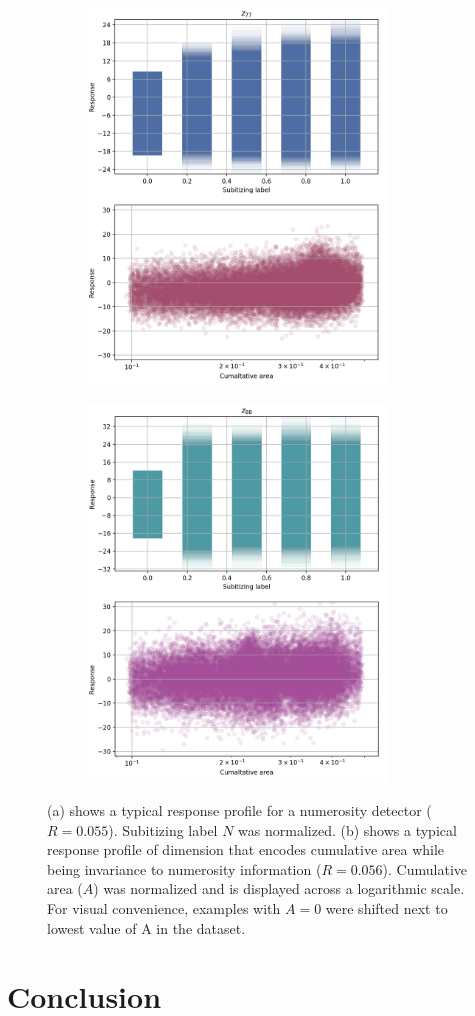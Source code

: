 \documentclass[twocolumn]{article}
\begin{document}
\begin{figure}[ht]
\centering
\begin{subfigure}{.5\textwidth}
  \centering
  \includegraphics[width=1.0\linewidth, height=10cm]{Nn-z77.png}
  \caption{}
  \label{fig:zn}
\end{subfigure}%
\begin{subfigure}{.5\textwidth}
  \centering
  \includegraphics[width=1.0\linewidth, height=10cm]{Na-z88.png}
   \caption{}
  \label{fig:za}
\end{subfigure}
\caption{(a) shows a typical response profile for a numerosity detector ($R=0.055$).  Subitizing label $N$ was normalized. (b) shows a typical response profile of dimension that encodes cumulative area while being invariance to numerosity information ($R=0.056$). Cumulative area ($A$) was normalized and is displayed across a logarithmic scale. For visual convenience, examples with $A=0$ were shifted next to lowest value of A in the dataset.}
\label{fig:linear}
\end{figure}
\hypertarget{conclusion}{%
\section{Conclusion}\label{conclusion}}
\end{document}
